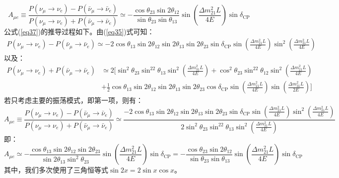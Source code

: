 \documentclass{article}
\begin{document}
	\begin{equation}
		A_{\mu e}\equiv\frac{P(\nu_\mu\to\nu_e)-P(\bar{\nu}_\mu\to\bar{\nu}_e)}{P(\nu_\mu\to\nu_e)+P(\bar{\nu}_\mu\to\bar{\nu}_e)}\simeq-\frac{\cos\theta_{23}\sin2\theta_{12}}{\sin\theta_{23}\sin\theta_{13}}\sin\left(\frac{\Delta m_{21}^2L}{4E}\right)\sin\delta_{\mathrm{CP}}	
		\label{eq37}
	\end{equation}
	公式(\ref{eq37})的推导过程如下。由(\ref{eq35})式可知：
	\begin{equation*}
		\begin{aligned}
			P(\nu_\mu\to\nu_e)-P(\bar{\nu}_\mu\to\bar{\nu}_e)\simeq-2\cos\theta_{13}\sin2\theta_{12}\sin2\theta_{13}\sin2\theta_{23}\sin\delta_{\mathrm{CP}}\sin\left(\frac{\Delta m_{21}^2L}{4E}\right)\sin^2\left(\frac{\Delta m_{31}^2L}{4E}\right)
		\end{aligned}
	\end{equation*}
	以及：
	\begin{equation*}
		\begin{aligned}
			P(\nu_\mu\to\nu_e)+P(\bar{\nu}_\mu\to\bar{\nu}_e)&\simeq2\Bigg[\sin^2\theta_{23}\sin^22\theta_{13}\sin^2\left(\frac{\Delta m_{31}^2L}{4E}\right)+\cos^2\theta_{23}\sin^22\theta_{12}\sin^2\left(\frac{\Delta m_{21}^2L}{4E}\right)\\&+\frac{1}{2}\cos\theta_{13}\sin2\theta_{12}\sin2\theta_{13}\sin2\theta_{23}\cos\delta_{\mathrm{CP}}\sin\left(\frac{\Delta m_{21}^2L}{4E}\right)\sin\left(\frac{\Delta m_{31}^2L}{2E}\right)\Bigg]
		\end{aligned}
	\end{equation*}
	若只考虑主要的振荡模式，即第一项，则有：
	\begin{equation*}
		A_{\mu e}\equiv\frac{P(\nu_\mu\to\nu_e)-P(\bar{\nu}_\mu\to\bar{\nu}_e)}{P(\nu_\mu\to\nu_e)+P(\bar{\nu}_\mu\to\bar{\nu}_e)}\simeq\frac{-2\cos\theta_{13}\sin2\theta_{12}\sin2\theta_{13}\sin2\theta_{23}\sin\delta_{\mathrm{CP}}\sin\left(\frac{\Delta m_{21}^2L}{4E}\right)\sin^2\left(\frac{\Delta m_{31}^2L}{4E}\right)}{2\sin^2\theta_{23}\sin^22\theta_{13}\sin^2\left(\frac{\Delta m_{31}^2L}{4E}\right)}
	\end{equation*}
	即：
	\begin{equation*}
		A_{\mu e}\simeq-\frac{\cos\theta_{13}\sin2\theta_{12}\sin2\theta_{23}}{\sin2\theta_{13}\sin^2\theta_{23}}\sin\left(\frac{\Delta m_{21}^2L}{4E}\right)\sin\delta_{\mathrm{CP}}	=-\frac{\cos\theta_{23}\sin2\theta_{12}}{\sin\theta_{23}\sin\theta_{13}}\sin\left(\frac{\Delta m_{21}^2L}{4E}\right)\sin\delta_{\mathrm{CP}}	
	\end{equation*}
	其中，我们多次使用了三角恒等式$\sin2x=2\sin x\cos x$。
\end{document}
